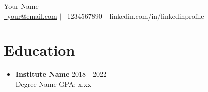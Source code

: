 \documentclass[a4paper,11pt]{article}
\newcommand{\resumeEdu}[4]{ \item[] \textbf{#1} \hfill \footnotesize{#3} \\ #2 \hfill \footnotesize{#4} }
\begin{document}
\newcommand{\name}{Your Name}
\newcommand{\emaila}{your@email.com}
\newcommand{\phone}{1234567890}
\newcommand{\linkedin}{linkedinprofile}
\begin{center}
\Large{\name} \\ \small \href{mailto:\emaila}{\faEnvelope\ \emaila} $|$ \faPhone\ \phone $|$ \faLinkedin\ linkedin.com/in/\linkedin
\end{center}
\section*{Education}
\begin{itemize}
\resumeEdu{Institute Name}{Degree Name}{2018 - 2022}{GPA: x.xx}
\end{itemize}
\end{document}
